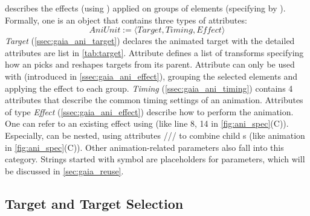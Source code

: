 \aniunit{} describes the effects (using ) applied on groups of elements (specifying by ). 
Formally, one \aniunit{} is an object that contains three types of attributes:
$$
AniUnit := \langle Target, Timing, Effect \rangle
$$
\textit{Target} (\autoref{ssec:gaia_ani_target}) declares the animated target with the detailed attributes are list in \autoref{tab:target}.
Attribute  defines a list of transforms specifying how an \aniunit{} picks and reshapes targets from its parent.
Attribute  can only be used with  (introduced in \autoref{ssec:gaia_ani_effect}), grouping the selected elements and applying the effect to each group.
\textit{Timing} (\autoref{ssec:gaia_ani_timing}) contains 4 attributes that describe the common timing settings of an animation.
Attributes of type \textit{Effect} (\autoref{ssec:gaia_ani_effect}) describe how to perform the animation.
One \aniunit{} can refer to an existing effect using  (like line 8, 14 in \autoref{fig:ani_spec}(C)).
Especially, \aniunit{} can be nested, using attributes /// to combine child \aniunit{}s (like  animation in \autoref{fig:ani_spec}(C)).
Other animation-related parameters also fall into this category.
Strings started with symbol \code{\$} are placeholders for parameters, which will be discussed in \autoref{sec:gaia_reuse}.


\subsection{Target and Target Selection}
\label{ssec:gaia_ani_target}


\begin{table}[]
	\caption{Target attributes}
	\vspace{-3mm}
	\label{tab:target}
	\vspace{-1mm}
\end{table}

